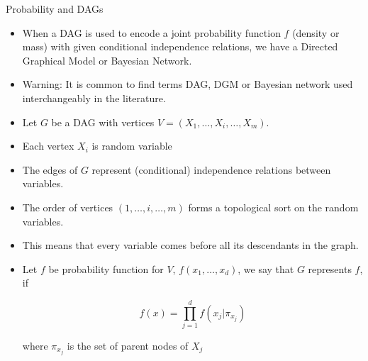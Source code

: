 \documentclass[handout]{beamer}
\begin{document}
\begin{frame}{Probability and DAGs}
\scriptsize{
\begin{itemize}

\item When a DAG is used to encode a joint probability function $f$ (density or mass) with given conditional independence relations, we have a Directed Graphical Model or Bayesian Network.

\item Warning: It is common to find terms DAG, DGM or Bayesian network used interchangeably in the literature. 


\item Let $G$ be a DAG with vertices $V = (X_1 , \dots , X_i, \dots, X_m )$. 
\item Each vertex $X_i$ is random variable


\item The edges of $G$ represent (conditional) independence relations between variables.



\item The order of vertices $(1,\dots,i,\dots,m)$ forms a topological sort on the random variables.

\item This means that every variable comes before all its descendants in the graph.

\item Let $f$ be probability function  for $V$, $f(x_1,\dots,x_d)$,  we say that $G$ represents $f$, if

\begin{displaymath}
 f(x) = \prod_{j=1}^d f(x_j| \pi_{x_j})
\end{displaymath}

where $\pi_{x_j}$ is the set of parent nodes of $X_j$



\end{itemize}



} 

\end{frame}
\end{document}
